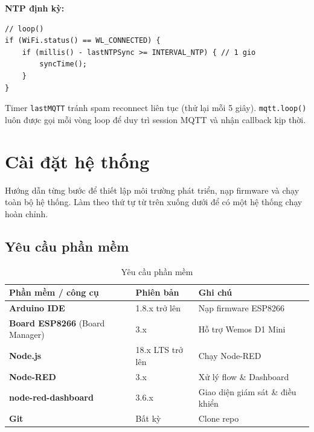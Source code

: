 \documentclass[13pt,a4paper]{article}
\newcommand{\code}[1]{\texttt{#1}}
\begin{document}
\textbf{NTP định kỳ:}

\begin{lstlisting}[style=cppcode, caption={Đồng bộ NTP định kỳ}, label={lst:ntp}]
// loop()
if (WiFi.status() == WL_CONNECTED) {
    if (millis() - lastNTPSync >= INTERVAL_NTP) { // 1 gio
        syncTime();
    }
}
\end{lstlisting}

Timer \code{lastMQTT} tránh spam reconnect liên tục (thử lại mỗi 5 giây). \code{mqtt.loop()} luôn được gọi mỗi vòng loop để duy trì session MQTT và nhận callback kịp thời.

\section{Cài đặt hệ thống}
\label{sec:cai-dat}

Hướng dẫn từng bước để thiết lập môi trường phát triển, nạp firmware và chạy toàn bộ hệ thống. Làm theo thứ tự từ trên xuống dưới để có một hệ thống chạy hoàn chỉnh.

\subsection{Yêu cầu phần mềm}
\label{sec:yeucau}

\begin{table}[htbp]
    \centering
    \caption{Yêu cầu phần mềm}
    \label{tbl:software}
    \begin{tabular}{|L{5cm}|C{3cm}|C{4.5cm}|}
        \hline
        \textbf{Phần mềm / công cụ} & \textbf{Phiên bản} & \textbf{Ghi chú} \\
        \hline
        \textbf{Arduino IDE} & 1.8.x trở lên & Nạp firmware ESP8266 \\
        \hline
        \textbf{Board ESP8266} (Board Manager) & 3.x & Hỗ trợ Wemos D1 Mini \\
        \hline
        \textbf{Node.js} & 18.x LTS trở lên & Chạy Node-RED \\
        \hline
        \textbf{Node-RED} & 3.x & Xử lý flow \& Dashboard \\
        \hline
        \textbf{node-red-dashboard} & 3.6.x & Giao diện giám sát \& điều khiển \\
        \hline
        \textbf{Git} & Bất kỳ & Clone repo \\
        \hline
    \end{tabular}
\end{table}
\end{document}
